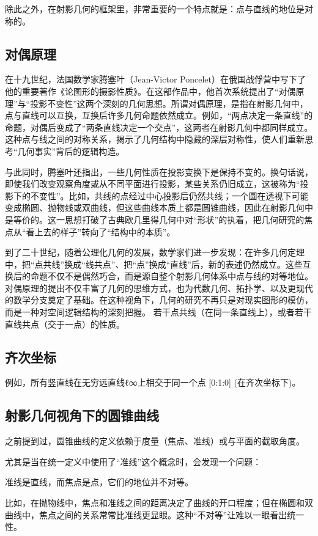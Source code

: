 除此之外，在射影几何的框架里，非常重要的一个特点就是：点与直线的地位是对称的。

\subsection{对偶原理}

在十九世纪，法国数学家腾塞叶（Jean-Victor Poncelet）在俄国战俘营中写下了他的重要著作《论图形的摄影性质》。在这部作品中，他首次系统提出了“对偶原理”与“投影不变性”这两个深刻的几何思想。所谓对偶原理，是指在射影几何中，点与直线可以互换，互换后许多几何命题依然成立。例如，“两点决定一条直线”的命题，对偶后变成了“两条直线决定一个交点”，这两者在射影几何中都同样成立。这种点与线之间的对称关系，揭示了几何结构中隐藏的深层对称性，使人们重新思考“几何事实”背后的逻辑构造。

与此同时，腾塞叶还指出，一些几何性质在投影变换下是保持不变的。换句话说，即使我们改变观察角度或从不同平面进行投影，某些关系仍旧成立，这被称为“投影下的不变性”。比如，共线的点经过中心投影后仍然共线；一个圆在透视下可能变成椭圆、抛物线或双曲线，但这些曲线本质上都是圆锥曲线，因此在射影几何中是等价的。这一思想打破了古典欧几里得几何中对“形状”的执着，把几何研究的焦点从“看上去的样子”转向了“结构中的本质”。

到了二十世纪，随着公理化几何的发展，数学家们进一步发现：在许多几何定理中，把“点共线”换成“线共点”、把“点”换成“直线”后，新的表述仍然成立。这些互换后的命题不仅不是偶然巧合，而是源自整个射影几何体系中点与线的对等地位。对偶原理的提出不仅丰富了几何的思维方式，也为代数几何、拓扑学、以及更现代的数学分支奠定了基础。在这种视角下，几何的研究不再只是对现实图形的模仿，而是一种对空间逻辑结构的深刻把握。
若干点共线（在同一条直线上），或者若干直线共点（交于一点）的性质。

\subsection{齐次坐标}
例如，所有竖直线在无穷远直线ℓ∞上相交于同一个点 [0:1:0] (在齐次坐标下)。
\subsection{射影几何视角下的圆锥曲线}

之前提到过，圆锥曲线的定义依赖于度量（焦点、准线）或与平面的截取角度。

尤其是当在统一定义中使用了“准线”这个概念时，会发现一个问题：

准线是直线，而焦点是点，它们的地位并不对等。

比如，在抛物线中，焦点和准线之间的距离决定了曲线的开口程度；但在椭圆和双曲线中，焦点之间的关系常常比准线更显眼。这种“不对等”让难以一眼看出统一性。

